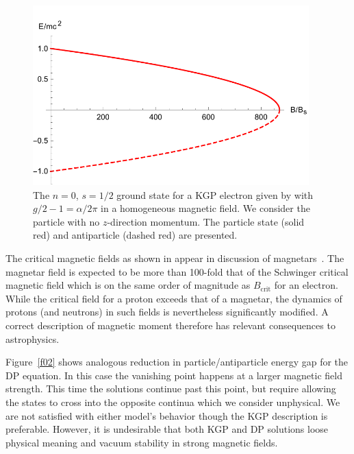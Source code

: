 \begin{figure}[ht]
     \centering
     \includegraphics[clip, trim=0.0cm 0.0cm 0.0cm 0.5cm,width=0.95\textwidth]{plots/chap02moment/lanplot01.pdf}
     \caption{The $n=0$, $s=1/2$ ground state for a KGP electron given by  with $g/2-1=\alpha/2\pi$ in a homogeneous magnetic field. We consider the particle with no $z$-direction momentum. The particle state (solid red) and antiparticle (dashed red) are presented.}
     \label{f01}
\end{figure}

The critical magnetic fields as shown in  appear in discussion of magnetars~\citep{Kaspi:2017fwg}. The magnetar field is expected to be more than 100-fold that of the Schwinger critical magnetic field which is on the same order of magnitude as $B_\textrm{crit}$ for an electron. While the critical field for a proton exceeds that of a magnetar, the dynamics of protons (and neutrons) in such fields is nevertheless significantly modified. A correct description of magnetic moment therefore has relevant consequences to astrophysics. 

Figure~\ref{f02} shows analogous reduction in particle/anti\-particle energy gap for the DP equation. In this case the vanishing point happens at a larger magnetic field strength. This time the solutions continue past this point, but require allowing the states to cross into the opposite continua which we consider unphysical. We are not satisfied with either model\rq s behavior though the KGP description is preferable. However, it is undesirable that both KGP and DP solutions loose physical meaning and vacuum stability in strong magnetic fields.

